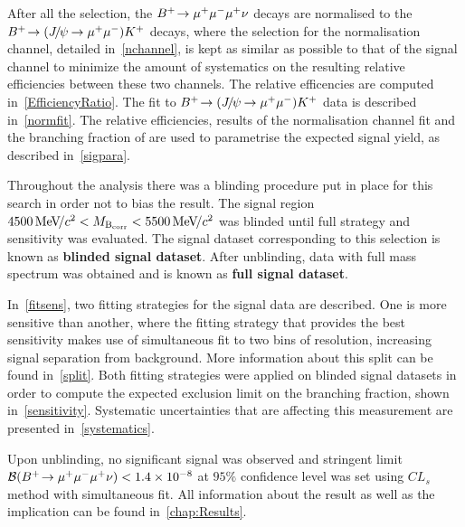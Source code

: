 After all the selection, the ${{{B}^+}}\!\rightarrow {\ensuremath{\mu^+\mu^-\mu^+}}\nu$ decays are normalised to the ${{{B}^+}}\!\rightarrow ({{J\mskip -3mu/\mskip -2mu\psi\mskip 2mu}}\!\rightarrow {\ensuremath{\mu^+\mu^-}}){{K}^+}$ decays, where the selection for the normalisation channel, detailed in~\autoref{nchannel}, is kept as similar as possible to that of the signal channel to minimize the amount of systematics on the resulting relative efficiencies between these two channels. The relative efficencies are computed in~\autoref{EfficiencyRatio}. The fit to ${{{B}^+}}\!\rightarrow ({{J\mskip -3mu/\mskip -2mu\psi\mskip 2mu}}\!\rightarrow {\ensuremath{\mu^+\mu^-}}){{K}^+}$ data is described in~\autoref{normfit}. The relative efficiencies, results of the normalisation channel fit and the branching fraction of \bjpsimumuk are used to parametrise the expected signal yield, as described in~\autoref{sigpara}.



Throughout the analysis there was a blinding procedure put in place for this search in order not to bias the result. The signal region $4500{{\mathrm{\,Me\kern -0.1em V\!/}c^2}}<M_{\rm{B_{corr}}}<{5500{\mathrm{\,Me\kern -0.1em V\!/}c^2}}$ was blinded until full strategy and sensitivity was evaluated. The signal dataset corresponding to this selection is known as \textbf{blinded signal dataset}. After unblinding, data with full mass spectrum was obtained and is known as \textbf{full signal dataset}.%



In~\autoref{fitsens}, two fitting strategies for the signal data are described. One is more sensitive than another, where the fitting strategy that provides the best sensitivity makes use of simultaneous fit to two bins of resolution, increasing signal separation from background. More information about this split can be found in~\autoref{split}. Both fitting strategies were applied on blinded signal datasets in order to compute the expected exclusion limit on the branching fraction, shown in~\autoref{sensitivity}. Systematic uncertainties that are affecting this measurement are presented in~\autoref{systematics}.


Upon unblinding, no significant signal was observed and stringent limit $\mathcal{B}({{{B}^+}}\!\rightarrow {\ensuremath{\mu^+\mu^-\mu^+}}\nu) < 1.4\times 10^{-8}$ at $95\%$ confidence level was set using $CL_{s}$ method with simultaneous fit. All information about the result as well as the implication can be found in~\autoref{chap:Results}.%


